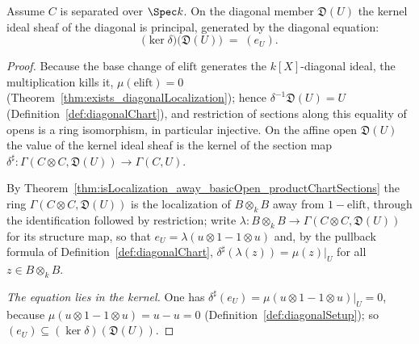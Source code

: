 \begin{theorem}
  \label{thm:diagonal_ker_ideal_diagonalChart}
  \leanok
  Assume \(C\) is separated over \(\Spec k\). On the diagonal member \(\mathfrak D(U)\) the kernel
  ideal sheaf of the diagonal is principal, generated by the diagonal equation:
  \[
    \bigl(\ker \delta\bigr)\bigl(\mathfrak D(U)\bigr) \;=\; (e_U).
  \]
\end{theorem}
\begin{proof}
  \leanok
  Because the base change of \(\mathrm{elift}\) generates the \(k[X]\)-diagonal ideal, the
  multiplication kills it, \(\mu(\mathrm{elift}) = 0\)
  (Theorem~\ref{thm:exists_diagonalLocalization}); hence \(\delta^{-1}\mathfrak D(U) = U\)
  (Definition~\ref{def:diagonalChart}), and restriction of sections along this equality of opens
  is a ring isomorphism, in particular injective. On the affine open \(\mathfrak D(U)\) the value
  of the kernel ideal sheaf is the kernel of the section map
  \(\delta^\sharp \colon \Gamma(C \otimes C, \mathfrak D(U)) \to \Gamma(C, U)\).

  By Theorem~\ref{thm:isLocalization_away_basicOpen_productChartSections} the ring
  \(\Gamma(C \otimes C, \mathfrak D(U))\) is the localization of \(B \otimes_k B\) away from
  \(1 - \mathrm{elift}\), through the identification followed by restriction; write
  \(\lambda \colon B \otimes_k B \to \Gamma(C \otimes C, \mathfrak D(U))\) for its structure map,
  so that \(e_U = \lambda(u \otimes 1 - 1 \otimes u)\) and, by the pullback formula of
  Definition~\ref{def:diagonalChart}, \(\delta^\sharp(\lambda(z)) = \mu(z)\big|_{U}\) for all
  \(z \in B \otimes_k B\).

  \emph{The equation lies in the kernel.} One has
  \(\delta^\sharp(e_U) = \mu(u \otimes 1 - 1 \otimes u)\big|_{U} = 0\), because
  \(\mu(u \otimes 1 - 1 \otimes u) = u - u = 0\) (Definition~\ref{def:diagonalSetup}); so
  \((e_U) \subseteq (\ker \delta)(\mathfrak D(U))\).


\end{proof}
